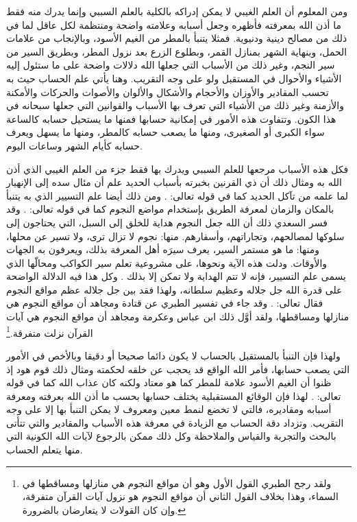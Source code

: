 ومن المعلوم أن العلم الغيبي لا يمكن إدراكه بالكلية بالعلم السببي وإنما يدرك منه فقط ما أذن الله بمعرفته فأظهره وجعل أسبابه وعلامته واضحة ومنتظمة لكل عاقل لما في ذلك من مصالح دينية ودنيوية. فمثلا يتنبأ بالمطر من الغيم الأسود، وبالإنجاب من علامات الحمل، وبنهاية الشهر بمنازل القمر، وبطلوع الزرع بعد نزول المطر، وبطريق السير من سير النجم، وغير ذلك من الأسباب التي جعلها الله دلالات واضحة على ما ستئول إليه الأشياء والأحوال في المستقبل ولو على وجه التقريب. وهنا يأتي علم الحساب حيث به تحسب المقادير والأوزان والأحجام والأشكال والألوان والأصوات والحركات والأمكنة والأزمنة وغير ذلك من الأشياء التي تعرف بها الأسباب والقوانين التي جعلها سبحانه في هذا الكون. وتتفاوت هذه الأمور في إمكانية حسابها فمنها ما يستحيل حسابه كالساعة سواء الكبرى أو الصغيرى، ومنها ما يصعب حسابه كالمطر، ومنها ما يسهل ويعرف حسابه كأيام الشهر وساعات اليوم. 

فكل هذه الأسباب مرجعها للعلم السببي ويدرك بها فقط جزء من العلم الغيبي الذي أذن الله به ومثال ذلك أن ذي القرنين بخبرته بأسباب الحديد علم أن مئال سده إلى الإنهيار لما علمه من تآكل الحديد كما في قوله تعالى: 
\quranayah*[18][98]{\footnotesize \surahname*[18]}. ومن ذلك أيضا علم التسيير الذي به يتنبأ بالمكان والزمان لمعرفة الطريق بإستخدام مواضع النجوم كما في قوله تعالى: 
\quranayah*[6][97]{\footnotesize \surahname*[6]}. وقد فسر السعدي ذلك أن الله جعل النجوم هداية للخلق إلى السبل، التي يحتاجون إلى سلوكها لمصالحهم، وتجاراتهم، وأسفارهم. منها: نجوم لا تزال ترى، ولا تسير عن محلها، ومنها: ما هو مستمر السير، يعرف سيرَه أهل المعرفة بذلك، ويعرفون به الجهات والأوقات. ودلت هذه الآية ونحوها، على مشروعية تعلم سير الكواكب ومحالّها الذي يسمى علم التسيير، فإنه لا تتم الهداية ولا تمكن إلا بذلك \cite{tafsir_Saadi}. وكل هذا فيه الدلالة الواضحة على قدرة الله جل جلاله وعظيم سلطانه، ولهذا فقد بين جل جلاله عظم مواقع النجوم فقال تعالى:  
\quranayah*[56][75-76]{\footnotesize \surahname*[56]}. وقد جاء في تفسير الطبري عن قتادة ومجاهد أن مواقع النجوم هي منازلها ومساقطها، ولقد أوَّل ذلك ابن عباس وعكرمة ومجاهد أن مواقع النجوم هي آيات القرآن نزلت متفرقة.\footnote{ولقد رجح الطبري القول الأول وهو أن مواقع النجوم هي منازلها ومساقطها في السماء، وهذا بخلاف القول الثاني أن مواقع النجوم هو نزول آيات القرآن متفرقة، وإن كان القولات لا يتعارضان بالضرورة.}

ولهذا فإن التنبأ بالمستقبل بالحساب لا يكون دائما صحيحا 
أو دقيقا وبالأخص في الأمور التي يصعب حسابها، فأمر الله الواقع قد يحجب عن خلقه لحكمته ومثال ذلك قوم هود إذ ظنوا أن الغيم الأسود علامة للمطر كما هو معتاد ولكنه كان عذاب الله كما في قوله تعالى: 
\quranayah*[46][24-25]{\footnotesize \surahname*[46]}. لهذا فإن الوقائع المستقبلية يختلف حسابها بحسب ما أذن الله بعرفته ومعرفة أسبابه ومقاديره، فالتي لا تخضع لنمط معين ومعروف لا يمكن التنبأ بها إلا على وجه التقريب. وتزداد دقة الحساب مع الزيادة في معرفة هذه الأسباب والمقادير والتي تتأتى بالبحث والتجربة والقياس والملاحظة وكل ذلك ممكن بالرجوع لآيات الله الكونية التي منها يتعلم الحساب. 

